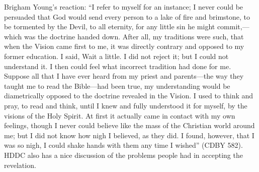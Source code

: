 		Brigham Young's reaction:
			``I refer to myself for an instance; I never could be persuaded that God would send every person to a lake of fire and brimstone, to be tormented by the Devil, to all eternity, for any little sin he might commit,---which was the doctrine handed down. After all, my traditions were such, that when the Vision came first to me, it was directly contrary and opposed to my former education. I said, Wait a little. I did not reject it; but I could not understand it. I then could feel what incorrect tradition had done for me. Suppose all that I have ever heard from my priest and parents---the way they taught me to read the Bible---had been true, my understanding would be diametrically opposed to the doctrine revealed in the Vision. I used to think and pray, to read and think, until I knew and fully understood it for myself, by the visions of the Holy Spirit. At first it actually came in contact with my own feelings, though I never could believe like the mass of the Christian world around me; but I did not know how nigh I believed, as they did. I found, however, that I was so nigh, I could shake hands with them any time I wished'' (CDBY 582).
		HDDC also has a nice discussion of the problems people had in accepting the revelation.
			
